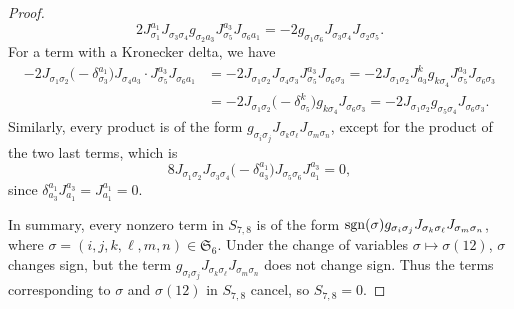 \documentclass[10pt,a4paper]{amsart}
\numberwithin{equation}{section}
\theoremstyle{definition}
\newcommand{\sgn}{{\rm sgn}}
\begin{document}
\begin{proof}
\[2J_{\sigma_1}^{a_1}J_{\sigma_3\sigma_4}g_{\sigma_2a_3}J_{\sigma_5}^{a_3}J_{\sigma_6a_1}
= -2g_{\sigma_1\sigma_6}J_{\sigma_3\sigma_4}J_{\sigma_2\sigma_5}.\]
For a term with a Kronecker delta, we have
\begin{align*}-2J_{\sigma_1\sigma_2}\bigl(-\delta_{\sigma_3}^{a_1}\bigr)J_{\sigma_4a_3}\cdot J_{\sigma_5}^{a_3}J_{\sigma_6a_1}
&= -2J_{\sigma_1\sigma_2}J_{\sigma_4\sigma_3}J^{a_3}_{\sigma_5}J_{\sigma_6\sigma_3}
= -2J_{\sigma_1\sigma_2}J^k_{a_3}g_{k\sigma_4}J^{a_3}_{\sigma_5}J_{\sigma_6\sigma_3}\\
&= -2J_{\sigma_1\sigma_2}\bigl(-\delta^k_{\sigma_5}\bigr)g_{k\sigma_4}J_{\sigma_6\sigma_3}
= -2J_{\sigma_1\sigma_2}g_{\sigma_5\sigma_4}J_{\sigma_6\sigma_3}.
\end{align*}
Similarly, every product is of the form $g_{\sigma_i\sigma_j} J_{\sigma_k\sigma_\ell}J_{\sigma_m\sigma_n}$,
except for the product of the two last terms, which is
\[8J_{\sigma_1\sigma_2}J_{\sigma_3\sigma_4}\bigl(-\delta_{a_3}^{a_1}\bigr)J_{\sigma_5\sigma_6}J_{a_1}^{a_3}
=0,\]
since $\delta_{a_3}^{a_1}J_{a_1}^{a_3} = J_{a_1}^{a_1} = 0$.

In summary, every nonzero term in $S_{7,8}$ is of the form $\sgn(\sigma)g_{\sigma_i\sigma_j} J_{\sigma_k\sigma_\ell}J_{\sigma_m\sigma_n}$, where $\sigma = (i,j,k,\ell,m,n)\in \mathfrak S_6$. Under the change of variables $\sigma\mapsto \sigma(12)$, $\sigma$ changes sign, but the term
$g_{\sigma_i\sigma_j} J_{\sigma_k\sigma_\ell}J_{\sigma_m\sigma_n}$ does not change sign. Thus the terms corresponding to $\sigma$ and $\sigma(12)$ in $S_{7,8}$ cancel, so $S_{7,8} = 0$.
\end{proof}
\end{document}
